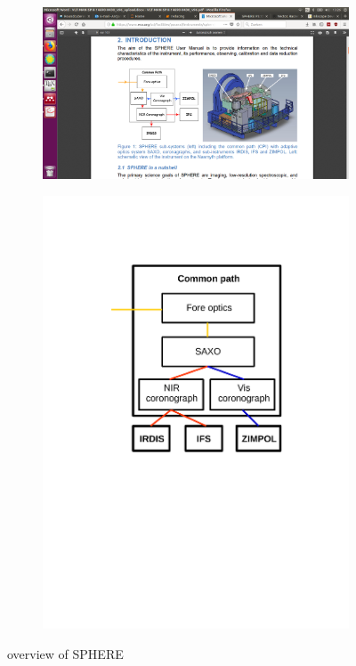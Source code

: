 \documentclass[twoside,single]{lion-msc}
\begin{document}
\begin{figure}[hb]
\centering
\begin{subfigure}{.58\textwidth}
  \centering
  \includegraphics[trim={25cm 6cm 7cm 8.8cm},clip,width = 1\linewidth]{overviewSPHERE}
  \caption{\citep{Observatory2007}}
\end{subfigure}\hfill
\begin{subfigure}{.38\textwidth}
  \centering
  \includegraphics[trim={5cm 12cm 3.5cm 3.5cm},clip,width=1\linewidth]{overview_SPHERE}
  \caption{}
\end{subfigure}
\caption{overview of SPHERE}
\label{fig:overviewSPHERE}
\end{figure}
\end{document}
